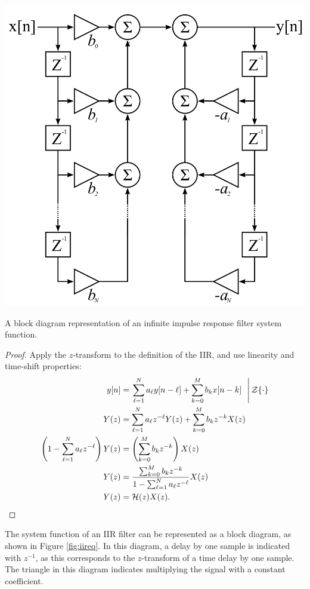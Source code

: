 \begin{marginfigure}
\begin{center}
\includegraphics[width=\textwidth]{ch19/figures/iir.png}
\end{center}
\caption{A block diagram representation of an infinite impulse response filter system function.}
\label{fig:iireq}
\end{marginfigure}

\begin{proof}
Apply the $z$-transform to the definition of the IIR, and use linearity and time-shift properties:
\begin{align}
y[n] &= \left.\sum_{\ell=1}^{N} a_{\ell} y[n-\ell] + \sum_{k=0}^{M} b_k x[n-k]~~\right| \mathcal{Z}\{ \cdot \} \\
Y(z) &= \sum_{\ell = 1}^{N} a_{\ell} z^{-\ell} Y(z) + \sum_{k=0}^{M} b_k z^{-k} X(z)\\
\left(1-\sum_{\ell=1}^{N} a_\ell z^{-\ell}\right) Y(z) &= \left(\sum_{k=0}^{M} b_k z^{-k}\right)X(z) \\
Y(z) &= \frac{\sum_{k=0}^{M}b_k z^{-k}}{1-\sum_{\ell=1}^{N}a_\ell z^{-\ell}} X(z)\\
Y(z) &= \mathcal{H}(z) X(z).
\end{align}
\end{proof}

The system function of an IIR filter can be represented as a block
diagram, as shown in Figure \ref{fig:iireq}. In this diagram, a delay
by one sample is indicated with $z^{-1}$, as this corresponds to the
$z$-transform of a time delay by one sample. The triangle in this
diagram indicates multiplying the signal with a constant coefficient.

